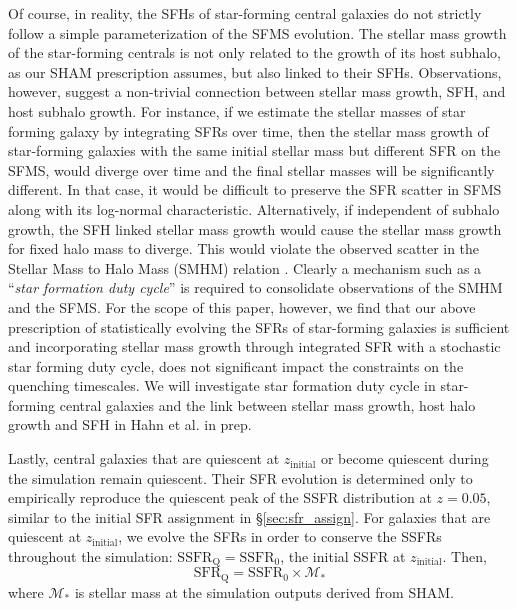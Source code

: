 \documentclass[iop,apj,tighten,twocolappendix,numberedappendix]{emulateapj}
\newcommand{\beq}{\begin{equation}}
\newcommand{\eeq}{\end{equation}}
\newcommand{\zinit}{z_\mathrm{initial}}
\begin{document}
Of course, in reality, the SFHs of star-forming central 
galaxies do not strictly follow a simple parameterization of
the SFMS evolution. The stellar mass growth of
the star-forming centrals is not only related to the growth 
of its host subhalo, as our SHAM prescription assumes, but 
also linked to their SFHs. Observations, however, suggest 
a non-trivial connection between stellar mass growth, SFH, 
and host subhalo growth. For instance, if we estimate the 
stellar masses of star forming galaxy by integrating SFRs over time, 
then the stellar mass growth of star-forming galaxies with the same 
initial stellar mass but different SFR on the SFMS, would diverge 
over time and the final stellar masses will be significantly different. 
In that case, it would be difficult to preserve the SFR scatter 
in SFMS along with its log-normal characteristic. 
Alternatively, if independent of subhalo growth, the SFH linked 
stellar mass growth would cause the stellar mass growth for fixed
halo mass to diverge. This would violate the observed 
scatter in the Stellar Mass to Halo Mass (SMHM) relation 
\citep{Leauthaud:2012aa, Tinker:2013aa, Zu:2015aa, Gu:2016aa}.
Clearly a mechanism such as a ``{\em star formation duty cycle}'' 
is required to consolidate observations of the SMHM and the SFMS. 
For the scope of this paper, however, we find that our above
prescription of statistically evolving the SFRs of 
star-forming galaxies is sufficient and incorporating 
stellar mass growth through integrated SFR with a stochastic  
star forming duty cycle, does not significant impact the 
constraints on the quenching timescales. We will investigate 
star formation duty cycle in star-forming central galaxies 
and the link between stellar mass growth, host halo growth
and SFH in Hahn et al. in prep.

Lastly, central galaxies that are quiescent at $\zinit$ 
or become quiescent during the simulation remain quiescent.
Their SFR evolution is determined only to empirically 
reproduce the quiescent peak of the SSFR distribution at $z=0.05$, similar to the 
initial SFR assignment in \S\ref{sec:sfr_assign}. For 
galaxies that are quiescent at $\zinit$, we evolve the 
SFRs in order to conserve the SSFRs throughout the 
simulation: $\mathrm{SSFR}_\mathrm{Q} = \mathrm{SSFR}_0$, 
the initial SSFR at $\zinit$. Then, 
\beq \label{eq:sfr_q}
\mathrm{SFR}_\mathrm{Q} = \mathrm{SSFR}_0 \times \mathcal{M}_*
\eeq
where $\mathcal{M}_*$ is stellar mass at the simulation outputs 
derived from SHAM. 
\end{document}
